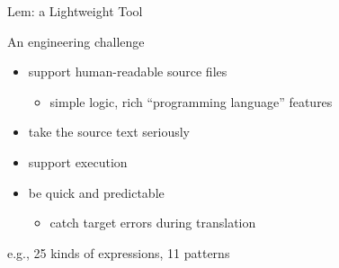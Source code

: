 \documentclass[pdf,nototal]{prosper}
\begin{document}
\begin{slide}{Lem: a Lightweight Tool}

\begin{center}An engineering challenge \end{center}
%

\vspace{12pt}

\begin{itemize}
\item support human-readable source files
\begin{itemize}
\item simple logic, rich ``programming language'' features
\end{itemize}
\item take the source text seriously
\item support execution
\item be quick and predictable
\begin{itemize}
\item catch target errors during translation
\end{itemize}
\end{itemize}

\vspace{24pt}

e.g., 25 kinds of expressions, 11 patterns
\end{slide}
\end{document}
